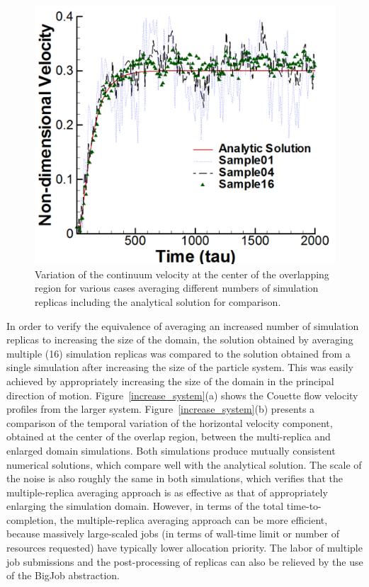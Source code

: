 \documentclass[preprint,12pt]{elsarticle}
\begin{document}
\begin{figure}
\centering
\includegraphics[width=0.6\linewidth]{Couette_025_Temporal_Multiset.pdf}
\vskip-0.2cm
\caption{\small {\bf} Variation of the continuum velocity at the center of the overlapping region for  various cases averaging different numbers of simulation replicas including the analytical solution for comparison. 
}
\label{multiple_couette_temporal}
\end{figure}

In order to verify the equivalence of averaging an increased number of simulation replicas to increasing the size of the domain, the solution obtained by averaging multiple (16) simulation replicas was compared to the solution obtained from a single simulation after increasing the size of the particle system. This was easily achieved by appropriately increasing the size of the domain in the principal direction of motion. Figure~\ref{increase_system}(a) shows the Couette flow velocity profiles from the larger system. Figure~\ref{increase_system}(b) presents a comparison of the temporal variation of the horizontal velocity component, obtained at the center of the overlap region, between the multi-replica and enlarged domain simulations.   Both simulations  produce mutually consistent numerical solutions, which compare well with the analytical solution. The scale of the noise is also roughly the same in both simulations, which verifies that the multiple-replica averaging approach is as effective as that of appropriately enlarging the simulation domain. However, in terms of the total time-to-completion, the multiple-replica averaging approach can be more efficient, because massively large-scaled jobs (in terms of wall-time limit or number of resources requested) have typically lower allocation priority. The labor of multiple job submissions and the post-processing of replicas can also be relieved by the use of the BigJob abstraction.
\end{document}
